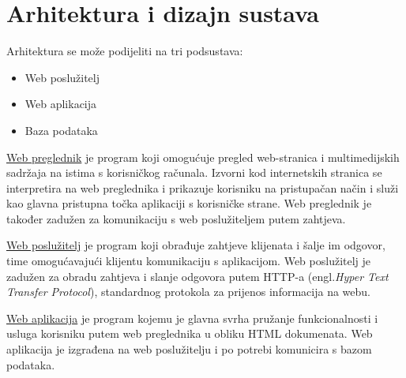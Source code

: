 \chapter{Arhitektura i dizajn sustava}
		


	Arhitektura se može podijeliti na tri podsustava:
	\begin{itemize}
		\item Web poslužitelj
		\item Web aplikacija
		\item Baza podataka
	\end{itemize}

	\underline{Web preglednik} je program koji omogućuje pregled web-stranica i multimedijskih sadržaja na istima s korisničkog računala. Izvorni kod internetskih stranica se interpretira na web preglednika i prikazuje korisniku na pristupačan način i služi kao glavna pristupna točka aplikaciji s korisničke strane. Web preglednik je također zadužen za komunikaciju s web poslužiteljem putem zahtjeva.
	
	\underline{Web poslužitelj} je program koji obrađuje zahtjeve klijenata i šalje im odgovor, time omogućavajući klijentu komunikaciju s aplikacijom. Web poslužitelj je zadužen za obradu zahtjeva i slanje odgovora putem HTTP-a (engl.\textit{Hyper Text Transfer Protocol}), standardnog protokola za prijenos informacija na webu.
	
	\underline{Web aplikacija} je program kojemu je glavna svrha pružanje funkcionalnosti i usluga korisniku putem web preglednika u obliku HTML dokumenata. Web aplikacija je izgrađena na web poslužitelju i po potrebi komunicira s bazom podataka.
	
